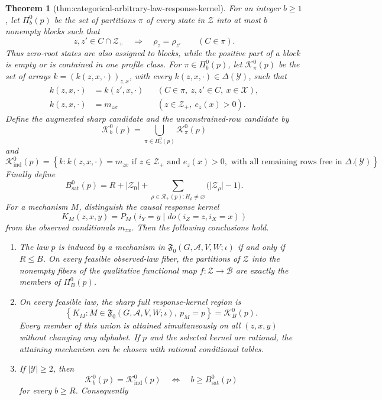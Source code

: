 \documentclass{article}
\newtheorem{theorem}{Theorem}
\begin{document}
\begin{theorem}[thm:categorical-arbitrary-law-response-kernel]
For an integer \(b\geq1\), let \(\Pi_b^0(p)\) be the set of partitions
\(\pi\) of every state in \(\mathcal Z\) into at most \(b\) nonempty
blocks such that
\[
 z,z'\in C\cap\mathcal Z_+\quad\Longrightarrow\quad \rho_z=\rho_{z'}
 \qquad(C\in\pi).
\]
Thus zero-root states are also assigned to blocks, while the positive
part of a block is empty or is contained in one profile class.  For
\(\pi\in\Pi_b^0(p)\), let \(\mathcal K_\pi^0(p)\) be the set of arrays
\(k=(k(z,x,\cdot))_{z,x}\), with every
\(k(z,x,\cdot)\in\Delta(\mathcal Y)\), such that
\[
 \begin{split}
 k(z,x,\cdot)&=k(z',x,\cdot)
 &&(C\in\pi,\ z,z'\in C,\ x\in\mathcal X),\\
 k(z,x,\cdot)&=m_{zx}
 &&(z\in\mathcal Z_+,\ e_z(x)>0).
 \end{split}
\]
Define the augmented sharp candidate and the unconstrained-row candidate
by
\[
 \mathcal K_b^0(p)=\bigcup_{\pi\in\Pi_b^0(p)}\mathcal K_\pi^0(p)
\]
and
\[
 \mathcal K_{\mathrm{ind}}^0(p)
 =\left\{k:
 k(z,x,\cdot)=m_{zx}\text{ if }z\in\mathcal Z_+
 \text{ and }e_z(x)>0,
 \text{ with all remaining rows free in }\Delta(\mathcal Y)
 \right\}.
\]
Finally define
\[
 B_{\mathrm{sat}}^0(p)
 =R+\lvert\mathcal Z_0\rvert+
 \sum_{\rho\in\mathcal R_+(p):H_\rho\ne\varnothing}
 \bigl(\lvert\mathcal Z_\rho\rvert-1\bigr).
\]
For a mechanism \(M\), distinguish the causal response kernel
\[
 K_M(z,x,y)=P_M(i_Y=y\mid do(i_Z=z,i_X=x))
\]
from the observed conditionals \(m_{zx}\).  Then the following conclusions
hold.
\begin{enumerate}
\item The law \(p\) is induced by a mechanism in
\(\mathfrak F_0(G,\mathcal A,V,W;\iota)\) if and only if \(R\leq B\).
On every feasible observed-law fiber, the partitions of \(\mathcal Z\)
into the nonempty fibers of the qualitative functional map
\(f:\mathcal Z\to\mathcal B\) are exactly the members of
\(\Pi_B^0(p)\).
\item On every feasible law, the sharp full response-kernel region is
\[
 \left\{K_M:M\in\mathfrak F_0(G,\mathcal A,V,W;\iota),\ p_M=p\right\}
 =\mathcal K_B^0(p).
\]
Every member of this union is attained simultaneously on all
\((z,x,y)\) without changing any alphabet.  If \(p\) and the selected
kernel are rational, the attaining mechanism can be chosen with rational
conditional tables.
\item If \(\lvert\mathcal Y\rvert\geq2\), then
\[
 \mathcal K_b^0(p)=\mathcal K_{\mathrm{ind}}^0(p)
 \quad\Longleftrightarrow\quad
 b\geq B_{\mathrm{sat}}^0(p)
\]
for every \(b\geq R\).  Consequently

\end{enumerate}
\end{theorem}
\end{document}
